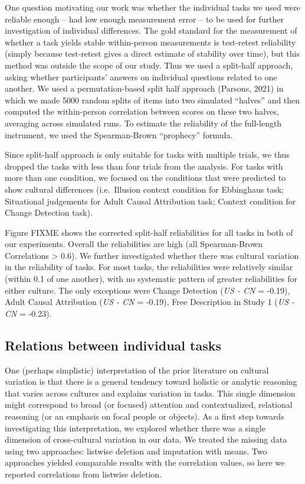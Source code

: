 \documentclass[
  man]{apa6}
\begin{document}
One question motivating our work was whether the individual tasks we used were reliable enough -- had low enough measurement error -- to be used for further investigation of individual differences. The gold standard for the measurement of whether a task yields stable within-person measurements is test-retest reliability (simply because test-retest gives a direct estimate of stability over time), but this method was outside the scope of our study. Thus we used a split-half approach, asking whether participants' answers on individual questions related to one another. We used a permutation-based split half approach (Parsons, 2021) in which we made 5000 random splits of items into two simulated ``halves'' and then computed the within-person correlation between scores on these two halves, averaging across simulated runs. To estimate the reliability of the full-length instrument, we used the Spearman-Brown ``prophecy'' formula.

Since split-half approach is only suitable for tasks with multiple trials, we thus dropped the tasks with less than four trials from the analysis. For tasks with more than one condition, we focused on the conditions that were predicted to show cultural differences (i.e.~Illusion context condition for Ebbinghaus task; Situational judgements for Adult Causal Attribution task; Context condition for Change Detection task).

Figure FIXME shows the corrected split-half reliabilities for all tasks in both of our experiments. Overall the reliabilities are high (all Spearman-Brown Correlations \textgreater{} 0.6). We further investigated whether there was cultural variation in the reliability of tasks. For most tasks, the reliabilities were relatively similar (within 0.1 of one another), with no systematic pattern of greater reliabilities for either culture. The only exceptions were Change Detection (\emph{US - CN} = -0.19), Adult Causal Attribution (\emph{US - CN} = -0.19), Free Description in Study 1 (\emph{US - CN} = -0.23).

\hypertarget{relations-between-individual-tasks}{%
\subsection{Relations between individual tasks}\label{relations-between-individual-tasks}}

One (perhaps simplistic) interpretation of the prior literature on cultural variation is that there is a general tendency toward holistic or analytic reasoning that varies across cultures and explains variation in tasks. This single dimension might correspond to broad (or focused) attention and contextualized, relational reasoning (or an emphasis on focal people or objects). As a first step towards investigating this interpretation, we explored whether there was a single dimension of cross-cultural variation in our data. We treated the missing data using two approaches: listwise deletion and imputation with means. Two approaches yielded comparable results with the correlation values, so here we reported correlations from listwise deletion.
\end{document}
